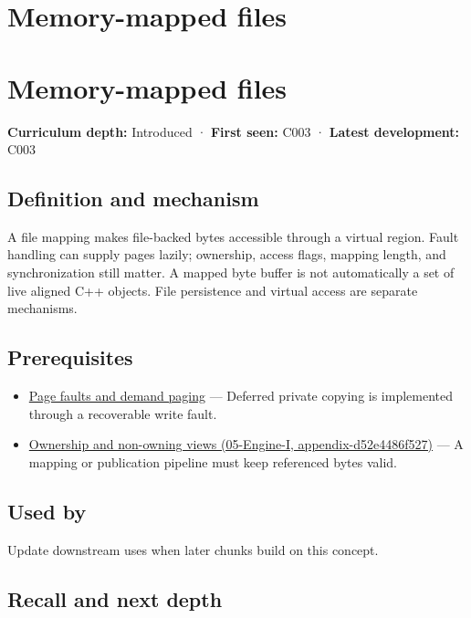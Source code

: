 \hypertarget{appendix-313ee7a0ba7b}{}
\section*{Memory-mapped files}
\section{Memory-mapped files}\label{memory-mapped-files}

\textbf{Curriculum depth:} Introduced · \textbf{First seen:} C003 · \textbf{Latest development:} C003

\subsection{Definition and mechanism}\label{definition-and-mechanism}

A file mapping makes file-backed bytes accessible through a virtual region. Fault handling can supply pages lazily; ownership, access flags, mapping length, and synchronization still matter. A mapped byte buffer is not automatically a set of live aligned C++ objects. File persistence and virtual access are separate mechanisms.

\subsection{Prerequisites}\label{prerequisites}

\begin{itemize}
\tightlist
\item
  \hyperref[appendix-cc0909a7ef14]{Page faults and demand paging} --- Deferred private copying is implemented through a recoverable write fault.
\item
  \href{}{Ownership and non-owning views (05-Engine-I, appendix-d52e4486f527)} --- A mapping or publication pipeline must keep referenced bytes valid.
\end{itemize}

\subsection{Used by}\label{used-by}

Update downstream uses when later chunks build on this concept.

\subsection{Recall and next depth}\label{recall-and-next-depth}

